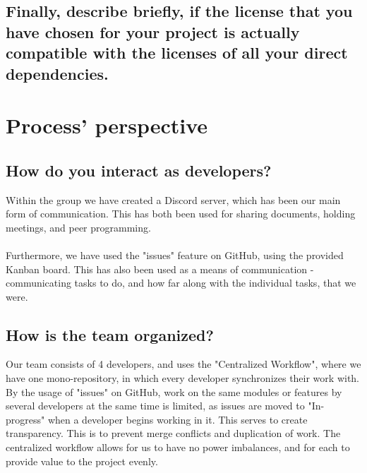 \documentclass{article}
\begin{document}
\subsection{Finally, describe briefly, if the license that you have chosen for your project is actually compatible with the licenses of all your direct dependencies.}


\section{Process' perspective}

\subsection{How do you interact as developers?}
Within the group we have created a Discord server, which has been our main form of communication. This has both been used for sharing documents, holding meetings, and peer programming.
\\\\
Furthermore, we have used the "issues" feature on GitHub, using the provided Kanban board. This has also been used as a means of communication - communicating tasks to do, and how far along with the individual tasks, that we were.

\subsection{How is the team organized?}
Our team consists of 4 developers, and uses the "Centralized Workflow", where we have one mono-repository, in which every developer synchronizes their work with. By the usage of "issues" on GitHub, work on the same modules or features by several developers at the same time is limited, as issues are moved to "In-progress" when a developer begins working in it. This serves to create transparency. This is to prevent merge conflicts and duplication of work. The centralized workflow allows for us to have no power imbalances, and for each to provide value to the project evenly.

%
%
\end{document}
